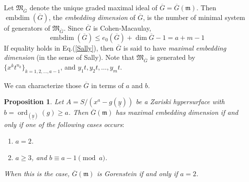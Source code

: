 \documentclass[12pt]{amsart}
\newtheorem{prop}[thm]{Proposition}
\theoremstyle{definition}
\theoremstyle{remark}
\numberwithin{equation}{section}
\newcommand{\m}{{\mathfrak m}}
\DeclareMathOperator{\ord}{ord}
\DeclareMathOperator{\emb}{embdim}
\newcommand{\MM}{\mathfrak M}
\begin{document}
\par \vspace{2mm}
Let $\MM_{\overline{G}}$ denote the unique graded maximal ideal of 
$\overline{G}=\overline{G}(\m)$. 
Then $\emb(\overline{G})$, the \textit{embedding dimension} of $\overline{G}$,  
is the number of minimal system of generators of $\MM_{\overline{G}}$. 
Since $\overline{G}$ is Cohen-Macaulay, 
\begin{equation} \label{Sally}
\emb(\overline{G}) \le e_0(\overline{G})+\dim \overline{G}-1=a+m-1
\end{equation}
If equality holds in Eq.(\ref{Sally}), then $\overline{G}$ is said to 
have \textit{maximal embedding dimension} (in the sense of Sally). 
Note that $\MM_{\overline{G}}$ is generated by 
$\{x^kt^{n_k}\}_{k=1,2,\ldots,a-1}$, and $y_1t,y_2t,\ldots, y_m t$.

\par \vspace{2mm}
We can characterize those $\overline{G}$ in terms of $a$ and $b$. 

\begin{prop} \label{MaxEmb}
Let $A=S/(x^a-g(\underline{y}))$ be a Zariski hypersurface with 
$b=\ord_{(\underline{y})}(g) \ge a$.   
Then $\overline{G}(\m)$ has maximal embedding dimension 
if and only if 
one of the following cases occurs$:$
\begin{enumerate}
\item[\rm{(a)}] $a=2$. 
\item[\rm{(b)}] $a \ge 3$,  and $b\equiv a-1 \pmod{a}$.  %
\end{enumerate}
When this is the case, 
$\overline{G}(\m)$ is Gorenstein if and only if $a=2$. 
\end{prop}
\end{document}
